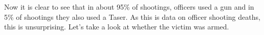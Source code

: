 \documentclass[
]{krantz}
\makeatletter
\newenvironment{Shaded}{\begin{snugshade}}{\end{snugshade}}
\newcommand{\CommentTok}[1]{\textcolor[rgb]{0.37,0.37,0.37}{\textit{#1}}}
\newcommand{\DecValTok}[1]{\textcolor[rgb]{0.06,0.06,0.06}{#1}}
\newcommand{\FunctionTok}[1]{\textcolor[rgb]{0,0,0}{#1}}
\newcommand{\NormalTok}[1]{#1}
\newcommand{\SpecialCharTok}[1]{\textcolor[rgb]{0,0,0}{#1}}
\newenvironment{kframe}{%
\medskip{}
\setlength{\fboxsep}{.8em}
 \def\at@end@of@kframe{}%
 \ifinner\ifhmode%
  \def\at@end@of@kframe{\end{minipage}}%
  \begin{minipage}{\columnwidth}%
 \fi\fi%
 \def\FrameCommand##1{\hskip\@totalleftmargin \hskip-\fboxsep
 \colorbox{shadecolor}{##1}\hskip-\fboxsep
     \hskip-\linewidth \hskip-\@totalleftmargin \hskip\columnwidth}%
 \MakeFramed {\advance\hsize-\width
   \@totalleftmargin\z@ \linewidth\hsize
   \@setminipage}}%
 {\par\unskip\endMakeFramed%
 \at@end@of@kframe}
\renewenvironment{Shaded}{\begin{kframe}}{\end{kframe}}
\makeatother
\begin{document}
\begin{Shaded}
\end{Shaded}

Now it is clear to see that in about 95\% of shootings,
officers used a gun and in 5\% of shootings they also used a
Taser. As this is data on officer shooting deaths, this is
unsurprising. Let's take a look at whether the victim was
armed.
\end{document}
